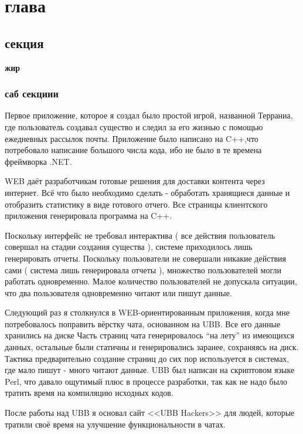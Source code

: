 \chapter{ глава } \label{chapt1}


\section{ секция} \label{sect1_1}

\textbf{жир} 

\subsection{саб секциии} \label{subsect1_1_1}

Первое приложение, которое я создал было простой игрой, названной Терраниа, где пользователь создавал существо и следил за его жизнью с помощью ежедневных рассылок почты. Приложение было написано на C++,что потребовало написание большого числа кода, ибо не было в те времена фреймворка .NET.

WEB  даёт разработчикам готовые решения для доставки контента через интернет. Всё что было необходимо сделать - обработать хранящиеся данные и отобразить статистику в виде готового отчего. Все страницы клиентского приложения генерировала программа на C++.

Поскольку интерфейс не требовал интерактива ( все действия пользователь совершал на стадии создания существа ),  системе приходилось лишь генерировать отчеты. Поскольку пользователи не совершали никакие действия сами ( система лишь генерировала отчеты ), множество пользователей могли работать одновременно. Малое количество пользователей не допускала ситуации, что два пользователя одновременно читают или пишут данные.


Следующий раз я столкнулся в WEB-ориентированным приложения, когда мне потребовалось поправить вёрстку чата, основанном на  UBB. Все его данные хранились на диске Часть страниц чата генерировалось ``на лету'' из имеющихся данных, остальные были статичны и генерировались заранее, сохраняясь на диск. Тактика предварительно создание страниц до сих пор используется в системах, где мало пишут - много читают данные. UBB был написан на скриптовом языке Perl, что давало ощутимый плюс в процессе разработки, так как не надо было тратить время на компиляцию исходных кодов.

После работы над UBB я основал сайт <<UBB Hackers>> для людей, которые тратили своё время на улучшение функциональности в чатах. 

